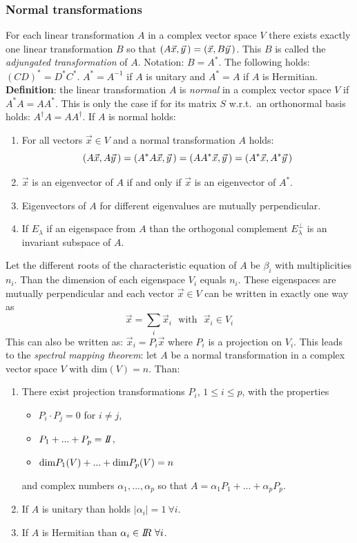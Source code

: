 \documentclass[twoside]{report}
\begin{document}
\subsubsection{Normal transformations}
For each linear transformation $A$ in a complex vector space $V$ there exists
exactly one linear transformation $B$ so that $(A\vec{x},\vec{y}\,)=(\vec{x},B\vec{y}\,)$.
This $B$ is called the {\it adjungated transformation} of $A$. Notation:
$B=A^*$.  The following holds: $(CD)^*=D^*C^*$. $A^*=A^{-1}$ if $A$ is unitary
and $A^*=A$ if $A$ is Hermitian.
\npar
{\bf Definition}: the linear transformation $A$ is {\it normal} in a complex
vector space $V$ if $A^*A=AA^*$. This is only the case if for its matrix $S$
w.r.t.\ an orthonormal basis holds: $A^\dagger A=AA^\dagger$.
\npar
If $A$ is normal holds:
\begin{enumerate}
\item For all vectors $\vec{x}\in V$ and a normal transformation $A$ holds:
\[
(A\vec{x},A\vec{y}\,)=(A^*A\vec{x},\vec{y}\,)=(AA^*\vec{x},\vec{y}\,)=(A^*\vec{x},A^*\vec{y}\,)
\]
\item $\vec{x}$ is an eigenvector of $A$ if and only if $\vec{x}$ is an
      eigenvector of $A^*$.
\item Eigenvectors of $A$ for different eigenvalues are mutually perpendicular.
\item If $E_\lambda$ if an eigenspace from $A$ than the orthogonal complement
      $E_\lambda^\perp$ is an invariant subspace of $A$.
\end{enumerate}
Let the different roots of the characteristic equation of $A$ be $\beta_i$ with
multiplicities $n_i$. Than the dimension of each eigenspace $V_i$ equals
$n_i$. These eigenspaces are mutually perpendicular and each vector
$\vec{x}\in V$ can be written in exactly one way as
\[
\vec{x}=\sum_i\vec{x}_i~~~\mbox{with}~~~\vec{x}_i\in V_i
\]
This can also be written as: $\vec{x}_i=P_i\vec{x}$ where $P_i$ is a projection
on $V_i$. This leads to the {\it spectral mapping theorem}: let $A$ be a normal
transformation in a complex vector space $V$ with dim$(V)=n$. Than:
\begin{enumerate}
\item There exist projection transformations $P_i$, $1\leq i\leq p$, with the
      properties
      \begin{itemize}
      \item $P_i\cdot P_j=0$ for $i\neq j$,
      \item $P_1+...+P_p=I\hspace{-1mm}I$,
      \item ${\rm dim}P_1(V)+...+{\rm dim}P_p(V)=n$
      \end{itemize}
      and complex numbers $\alpha_1,...,\alpha_p$ so that
      $A=\alpha_1P_1+...+\alpha_pP_p$.
\item If $A$ is unitary than holds $|\alpha_i|=1~\forall i$.
\item If $A$ is Hermitian than $\alpha_i\in I\hspace{-1mm}R~\forall i$.
\end{enumerate}
\end{document}

